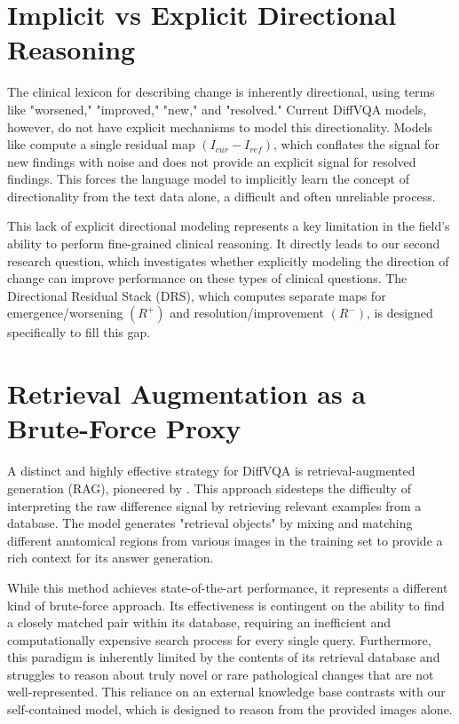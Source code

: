 \section{Implicit vs Explicit Directional Reasoning}
The clinical lexicon for describing change is inherently directional, using terms like "worsened," "improved," "new," and "resolved." Current DiffVQA models, however, do not have explicit mechanisms to model this directionality. Models like \cite{real} compute a single residual map $(I_{cur} - I_{ref})$, which conflates the signal for new findings with noise and does not provide an explicit signal for resolved findings. This forces the language model to implicitly learn the concept of directionality from the text data alone, a difficult and often unreliable process.

This lack of explicit directional modeling represents a key limitation in the field's ability to perform fine-grained clinical reasoning. It directly leads to our second research question, which investigates whether explicitly modeling the direction of change can improve performance on these types of clinical questions. The Directional Residual Stack (DRS), which computes separate maps for emergence/worsening $(R^+)$ and resolution/improvement $(R^-)$, is designed specifically to fill this gap.

\section {Retrieval Augmentation as a Brute-Force Proxy}
A distinct and highly effective strategy for DiffVQA is retrieval-augmented generation (RAG), pioneered by \cite{regiomix}. This approach sidesteps the difficulty of interpreting the raw difference signal by retrieving relevant examples from a database. The model generates "retrieval objects" by mixing and matching different anatomical regions from various images in the training set to provide a rich context for its answer generation. 

While this method achieves state-of-the-art performance, it represents a different kind of brute-force approach. Its effectiveness is contingent on the ability to find a closely matched pair within its database, requiring an inefficient and computationally expensive search process for every single query. Furthermore, this paradigm is inherently limited by the contents of its retrieval database and struggles to reason about truly novel or rare pathological changes that are not well-represented. This reliance on an external knowledge base contrasts with our self-contained model, which is designed to reason from the provided images alone.

